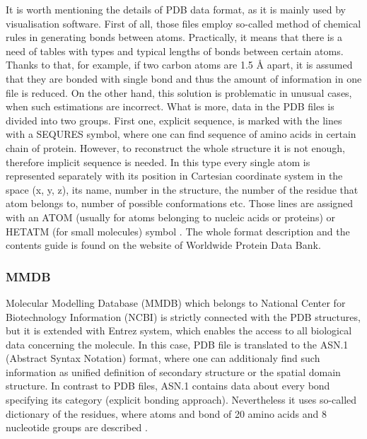 It is worth mentioning  the details of PDB data format, as it is mainly used by visualisation software. First of all, those files  employ so-called method of chemical rules in generating bonds between atoms. Practically, it means that there is a need of tables with types and typical lengths of bonds between certain atoms. Thanks to that, for example, if two carbon atoms are 1.5 {\AA} apart, it is assumed that they are bonded with single bond and thus the amount of information in one file is reduced. On the other hand, this solution is problematic in unusual cases, when such estimations are incorrect. What is more, data in the PDB files is divided into two groups. First one, explicit sequence, is marked with the lines with a SEQURES symbol, where one can find sequence of amino acids in certain chain of protein. However, to reconstruct the whole structure it is not enough, therefore implicit sequence is needed. In this type every single atom is represented separately with its position in Cartesian coordinate system in the space (x, y, z), its name, number in the structure, the number of the residue that atom belongs to, number of possible conformations etc. Those lines are assigned with an ATOM (usually for atoms belonging to nucleic acids or proteins) or HETATM (for small molecules) symbol \citep{Gruca10}. The whole format description and the contents guide is found on the website of Worldwide Protein Data Bank.

\subsubsection{MMDB}
Molecular Modelling Database (MMDB) which belongs to National Center for Biotechnology Information (NCBI) is strictly connected with the PDB structures, but it is extended with Entrez system, which enables the access to all biological data concerning the molecule. In this case, PDB file is translated to the ASN.1 (Abstract Syntax Notation) format, where one can additionaly find such information as unified definition of secondary structure or the spatial domain structure. In contrast to PDB files, ASN.1 contains data about every bond specifying its category (explicit bonding approach). Nevertheless it uses so-called dictionary of the residues, where atoms and bond of 20 amino acids and 8 nucleotide groups are described \citep{Gruca10}.

